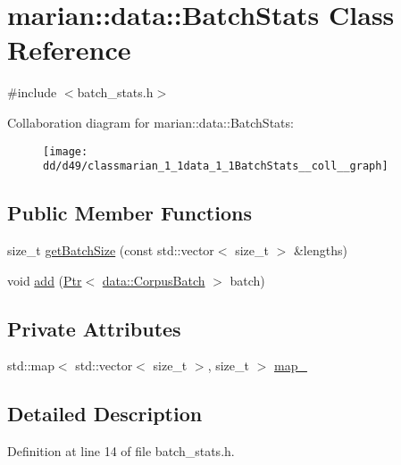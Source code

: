 \hypertarget{classmarian_1_1data_1_1BatchStats}{}\section{marian\+:\+:data\+:\+:Batch\+Stats Class Reference}
\label{classmarian_1_1data_1_1BatchStats}


{\ttfamily \#include $<$batch\+\_\+stats.\+h$>$}



Collaboration diagram for marian\+:\+:data\+:\+:Batch\+Stats\+:
\nopagebreak
\begin{figure}[H]
\begin{center}
\leavevmode
\texttt{[image: dd/d49/classmarian\_1\_1data\_1\_1BatchStats\_\_coll\_\_graph]}
\end{center}
\end{figure}
\subsection*{Public Member Functions}
\begin{DoxyCompactItemize}
\item 
size\+\_\+t \hyperlink{classmarian_1_1data_1_1BatchStats_a4f93dbb14442f458ffd59fc61013121d}{get\+Batch\+Size} (const std\+::vector$<$ size\+\_\+t $>$ \&lengths)
\item 
void \hyperlink{classmarian_1_1data_1_1BatchStats_af6f94f769fcb4ef0555d6dd9c7530ad5}{add} (\hyperlink{namespacemarian_ad1a373be43a00ef9ce35666145137b08}{Ptr}$<$ \hyperlink{classmarian_1_1data_1_1CorpusBatch}{data\+::\+Corpus\+Batch} $>$ batch)
\end{DoxyCompactItemize}
\subsection*{Private Attributes}
\begin{DoxyCompactItemize}
\item 
std\+::map$<$ std\+::vector$<$ size\+\_\+t $>$, size\+\_\+t $>$ \hyperlink{classmarian_1_1data_1_1BatchStats_aef18dc170f66ae7505328f1ccd12959b}{map\+\_\+}
\end{DoxyCompactItemize}


\subsection{Detailed Description}


Definition at line 14 of file batch\+\_\+stats.\+h.



